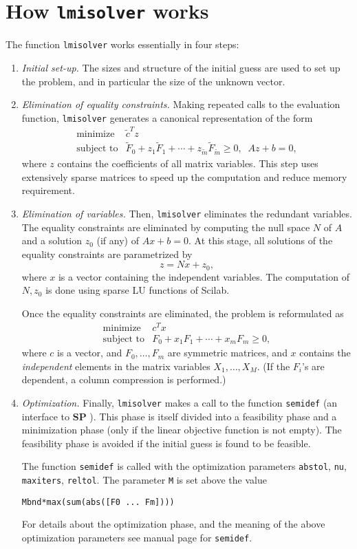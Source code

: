 \section{How {\tt lmisolver} works}
\label{s-lmisolver-works}
The function {\tt lmisolver} works essentially in four steps:
\begin{enumerate}
\item
{\em Initial set-up.}  The sizes and structure of the initial guess are
used to set up the problem, and in particular the size of the unknown
vector.
\item
{\em Elimination of equality constraints.}  Making repeated calls
to the evaluation function, {\tt lmisolver} generates 
a canonical representation of the form
\[
 \begin{array}{ll} \mbox{minimize} & \tilde{c}^T z\\ 
 \mbox{subject to} & \tilde{F}_0 + z_1\tilde{F}_1 + \cdots +
z_{\tilde{m}} \tilde{F}_{\tilde{m}} \geq 0, \;\; Az + b = 0,
 \end{array}
\]
where $z$ contains the coefficients of all matrix variables. 
This step uses extensively  sparse matrices to speed up
the computation and reduce memory requirement.
\item
{\em Elimination of variables.} Then, {\tt lmisolver} 
eliminates the redundant variables.  The equality
constraints are eliminated by computing the null space $N$ of $A$ and
a solution $z_0$ (if any) of $Ax+b=0$.  At this stage, all solutions
of the equality constraints are parametrized by 
\[
z = Nx+z_0,
\]
where $x$ is a vector containing the independent variables.  The
computation of $N,z_0$ is done using sparse LU functions of Scilab.

Once the equality constraints are eliminated, the problem is
reformulated as
\[
 \begin{array}{ll} \mbox{minimize} & c^T x\\
 \mbox{subject to} & F_0 + x_1F_1 + \cdots + x_m F_m \geq 0,
 \end{array}
\]
where $c$ is a vector, and $F_0,\ldots,F_m$ are symmetric matrices,
and $x$ contains the {\em independent\/} elements in the matrix
variables $X_1,\ldots,X_M$.  (If the $F_i$'s are dependent, a column
compression is performed.)
\item
{\em Optimization.}
Finally, {\tt lmisolver} makes a call to the function {\tt semidef}
(an interface to {\bf SP} \cite{sp}). This phase is itself divided into a
feasibility phase and a minimization phase (only if the linear
objective function is not empty).  The feasibility phase is avoided if
the initial guess is found to be feasible. 

The function {\tt semidef} is called with the optimization
parameters {\tt abstol}, {\tt nu}, {\tt maxiters}, {\tt reltol}.  The
parameter {\tt M} is set above the value
\begin{verbatim}
Mbnd*max(sum(abs([F0 ... Fm])))
\end{verbatim}
For details about the optimization phase, and the meaning of the above
optimization parameters see manual page for {\tt semidef}.
\end{enumerate}

